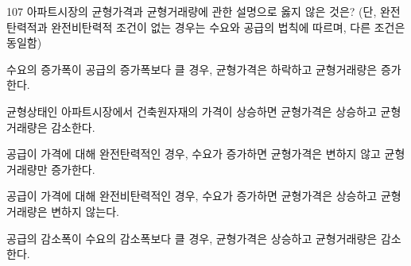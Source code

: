 \begin{question}{107}
아파트시장의 균형가격과 균형거래량에 관한 설명으로 옳지 않은 것은? (단, 완전탄력적과 완전비탄력적 조건이 없는 경우는 수요와 공급의 법칙에 따르며, 다른 조건은 동일함)
\begin{choices}
  \item 수요의 증가폭이 공급의 증가폭보다 클 경우, 균형가격은 하락하고 균형거래량은 증가한다.
  \item 균형상태인 아파트시장에서 건축원자재의 가격이 상승하면 균형가격은 상승하고 균형거래량은 감소한다.
  \item 공급이 가격에 대해 완전탄력적인 경우, 수요가 증가하면 균형가격은 변하지 않고 균형거래량만 증가한다.
  \item 공급이 가격에 대해 완전비탄력적인 경우, 수요가 증가하면 균형가격은 상승하고 균형거래량은 변하지 않는다.
  \item 공급의 감소폭이 수요의 감소폭보다 클 경우, 균형가격은 상승하고 균형거래량은 감소한다.
\end{choices}
\end{question}
